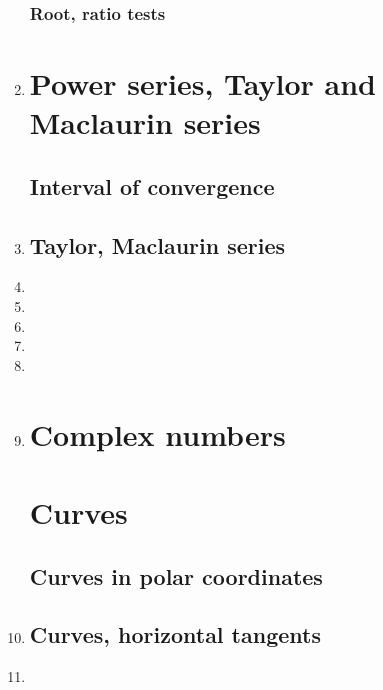 \documentclass{article}
\begin{document}
\begin{enumerate}
\subsubsection{Root, ratio tests}
\item 

\section{Power series, Taylor and Maclaurin series}
\subsection{Interval of convergence}
\item 
\subsection{Taylor, Maclaurin series}
\item 
\item 
\item 
\item 
\item 
\item 
\section{Complex numbers}


\section{Curves}
\subsection{Curves in polar coordinates}
\item 

\subsection{Curves, horizontal tangents}
\item 



\end{enumerate}
\end{document}
